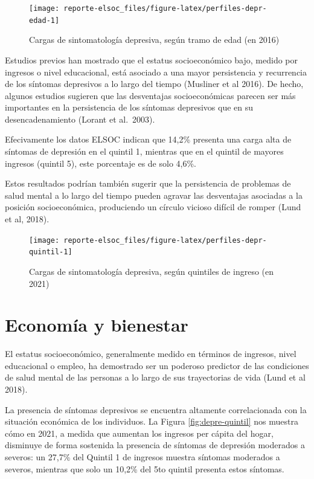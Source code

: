\documentclass[
  12pt,
]{book}
\begin{document}
\begin{figure}

{\centering \texttt{[image: reporte-elsoc\_files/figure-latex/perfiles-depr-edad-1]} 

}

\caption{Cargas de sintomatología depresiva, según tramo de edad (en 2016)}\label{fig:perfiles-depr-edad}
\end{figure}

Estudios previos han mostrado que el estatus socioeconómico bajo, medido por ingresos o nivel educacional, está asociado a una mayor persistencia y recurrencia de los síntomas depresivos a lo largo del tiempo (Musliner et al 2016). De hecho, algunos estudios sugieren que las desventajas socioeconómicas parecen ser más importantes en la persistencia de los síntomas depresivos que en su desencadenamiento (Lorant et al.~2003).

Efecivamente los datos ELSOC indican que 14,2\% presenta una carga alta de síntomas de depresión en el quintil 1, mientras que en el quintil de mayores ingresos (quintil 5), este porcentaje es de solo 4,6\%.

Estos resultados podrían también sugerir que la persistencia de problemas de salud mental a lo largo del tiempo pueden agravar las desventajas asociadas a la posición socioeconómica, produciendo un círculo vicioso difícil de romper (Lund et al, 2018).

\begin{figure}

{\centering \texttt{[image: reporte-elsoc\_files/figure-latex/perfiles-depr-quintil-1]} 

}

\caption{Cargas de sintomatología depresiva, según quintiles de ingreso (en 2021)}\label{fig:perfiles-depr-quintil}
\end{figure}

\hypertarget{economuxeda-y-bienestar}{%
\section{Economía y bienestar}\label{economuxeda-y-bienestar}}

El estatus socioeconómico, generalmente medido en términos de ingresos, nivel educacional o empleo, ha demostrado ser un poderoso predictor de las condiciones de salud mental de las personas a lo largo de sus trayectorias de vida (Lund et al 2018).

La presencia de síntomas depresivos se encuentra altamente correlacionada con la situación económica de los individuos. La Figura \ref{fig:depre-quintil} nos muestra cómo en 2021, a medida que aumentan los ingresos per cápita del hogar, disminuye de forma sostenida la presencia de síntomas de depresión moderados a severos: un 27,7\% del Quintil 1 de ingresos muestra síntomas moderados a severos, mientras que solo un 10,2\% del 5to quintil presenta estos síntomas.
\end{document}
